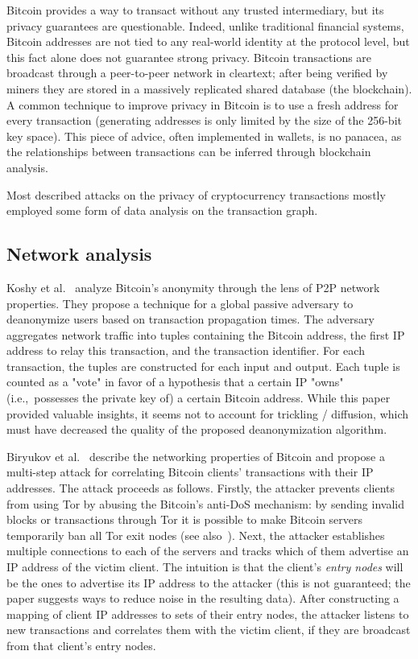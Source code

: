Bitcoin provides a way to transact without any trusted intermediary, but its privacy guarantees are questionable.
Indeed, unlike traditional financial systems, Bitcoin addresses are not tied to any real-world identity at the protocol level, but this fact alone does not guarantee strong privacy.
Bitcoin transactions are broadcast through a peer-to-peer network in cleartext; after being verified by miners they are stored in a massively replicated shared database (the blockchain).
A common technique to improve privacy in Bitcoin is to use a fresh address for every transaction (generating addresses is only limited by the size of the 256-bit key space).
This piece of advice, often implemented in wallets, is no panacea, as the relationships between transactions can be inferred through blockchain analysis.

Most described attacks on the privacy of cryptocurrency transactions mostly employed some form of data analysis on the transaction graph.

\subsection{Network analysis}

Koshy et al.~\cite{Koshy2014} analyze Bitcoin's anonymity through the lens of P2P network properties.
They propose a technique for a global passive adversary to deanonymize users based on transaction propagation times.
The adversary aggregates network traffic into tuples containing the Bitcoin address, the first IP address to relay this transaction, and the transaction identifier.
For each transaction, the tuples are constructed for each input and output.
Each tuple is counted as a "vote" in favor of a hypothesis that a certain IP "owns" (i.e.,~possesses the private key of) a certain Bitcoin address.
While this paper provided valuable insights, it seems not to account for trickling / diffusion, which must have decreased the quality of the proposed deanonymization algorithm.

Biryukov et al.~\cite{Biryukov2014} describe the networking properties of Bitcoin and propose a multi-step attack for correlating Bitcoin clients' transactions with their IP addresses.
The attack proceeds as follows.
Firstly, the attacker prevents clients from using Tor by abusing the Bitcoin's anti-DoS mechanism: by sending invalid blocks or transactions through Tor it is possible to make Bitcoin servers temporarily ban all Tor exit nodes (see also~\cite{Biryukov2015}).
Next, the attacker establishes multiple connections to each of the servers and tracks which of them advertise an IP address of the victim client.
The intuition is that the client's \textit{entry nodes} will be the ones to advertise its IP address to the attacker (this is not guaranteed; the paper suggests ways to reduce noise in the resulting data).
After constructing a mapping of client IP addresses to sets of their entry nodes, the attacker listens to new transactions and correlates them with the victim client, if they are broadcast from that client's entry nodes.

